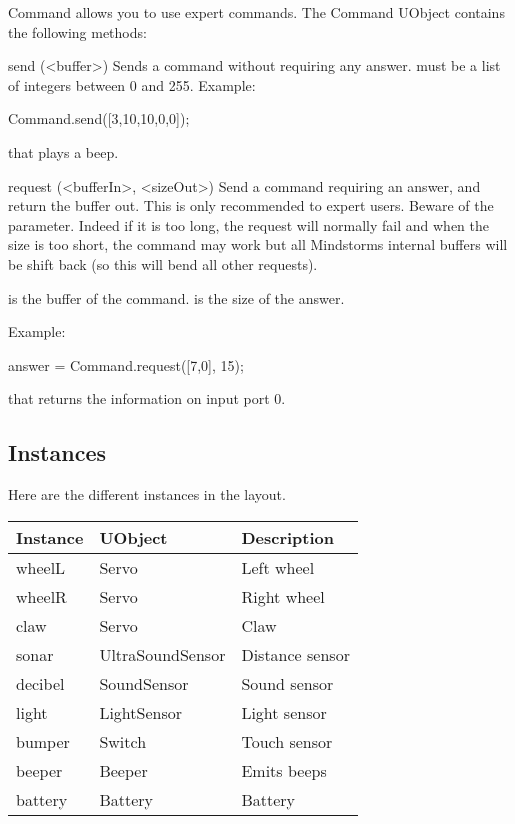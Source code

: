 Command allows you to use expert commands. The Command UObject contains the
following methods:
\begin{urbiscriptapi}
\item[send](<buffer>) Sends a command without requiring any answer.
   must be a list of integers between 0 and 255.  Example:
\begin{urbiunchecked}
Command.send([3,10,10,0,0]);
\end{urbiunchecked}
\noindent
that plays a beep.

\item[request](<bufferIn>, <sizeOut>)%
  Send a command requiring an answer, and return the buffer out. This is
  only recommended to expert users. Beware of the 
  parameter. Indeed if it is too long, the request will normally fail and
  when the size is too short, the command may work but all Mindstorms
  internal buffers will be shift back (so this will bend all other
  requests).

   is the buffer of the command.  is the size of
  the answer.

  Example:
\begin{urbiunchecked}
answer = Command.request([7,0], 15);
\end{urbiunchecked}

that returns the information on input port 0.
\end{urbiscriptapi}

\subsection{Instances}
Here are the different instances in the  layout.

\begin{center}
  \begin{tabular}{|l|l|l|}
    \hline
    Instance & UObject          & Description    \\
    \hline
    wheelL   & Servo            & Left wheel     \\
    wheelR   & Servo            & Right wheel    \\
    claw     & Servo            & Claw           \\
    sonar    & UltraSoundSensor & Distance sensor\\
    decibel  & SoundSensor      & Sound sensor   \\
    light    & LightSensor      & Light sensor   \\
    bumper   & Switch           & Touch sensor   \\
    beeper   & Beeper           & Emits beeps    \\
    battery  & Battery          & Battery        \\
    \hline
  \end{tabular}
\end{center}

